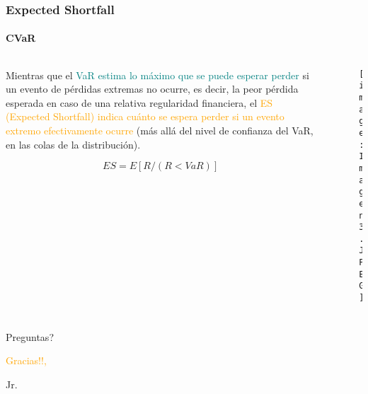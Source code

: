 \documentclass[aspectratio=169]{beamer}
\begin{document}



\begin{frame}
\frametitle{Expected Shortfall}
\framesubtitle{CVaR}


\begin{columns}
\begin{column}{0.5\textwidth}

Mientras que el \textcolor{teal}{VaR estima lo máximo que se puede esperar perder} si un evento de pérdidas extremas no ocurre, es decir, la peor pérdida esperada en caso de una relativa regularidad financiera, el \textcolor{orange}{ES (Expected Shortfall) indica cuánto se espera perder si un evento extremo efectivamente ocurre} (más allá del nivel de confianza del VaR, en las colas de la distribución).


\begin{equation}
ES = E[R / ( R < VaR )] \nonumber
\end{equation}



\end{column}
\begin{column}{0.5\textwidth}  %

\begin{figure}[h!]
\begin{center}
    \texttt{[image: Imagen3.JPEG]}
\end{center}
\end{figure}

\end{column}
\end{columns}






\end{frame}










\begin{frame}
\frametitle{}
\framesubtitle{}

  \vspace{2cm}
  {\huge Preguntas?}


\vspace{2.5cm}

\begin{flushright}
\textcolor{orange}{  Gracias!!,}
\end{flushright}

  
  \begin{flushright}
    Jr.
    
  \end{flushright}


\end{frame}





\end{document}
